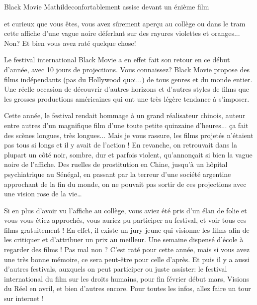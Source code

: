 \vspace*{-1.8cm}
\begin{article}
{Black Movie}
{Mathilde}{confortablement assise devant un énième film}

 et curieux que vous êtes, vous avez sûrement aperçu au collège ou dans le tram cette affiche d'une vague noire déferlant sur des rayures violettes et oranges... Non? Et bien vous avez raté quelque chose!

Le festival international Black Movie a en effet fait son retour en ce début d'année, avec 10 jours de projections. Vous connaissez? Black Movie propose des films indépendants (pas du Hollywood quoi...) de tous genres et du monde entier. Une réelle occasion de découvrir d'autres horizons et d'autres styles de films que les grosses productions américaines qui ont une très légère tendance à s'imposer.


Cette année, le festival rendait hommage à un grand réalisateur chinois, auteur entre autres d'un magnifique film d'une toute petite quinzaine d'heures... ça fait des scènes longues, très longues... Mais je vous rassure, les films projetés n'étaient pas tous si longs et il y avait de l'action ! En revanche, on retrouvait dans la plupart un côté noir, sombre, dur et parfois violent, qu'annonçait si bien la vague noire de l'affiche. Des ruelles de prostitution en Chine, jusqu'à un hôpital psychiatrique au Sénégal, en passant par la terreur d'une société argentine approchant de la fin du monde, on ne pouvait pas sortir de ces projections avec une vision rose de la vie…

Si en plus d'avoir vu l'affiche au collège, vous aviez été pris d'un élan de folie et vous vous étiez approchés, vous auriez pu participer au festival, et voir tous ces films gratuitement ! En effet, il existe un jury jeune qui visionne les films afin de les critiquer et d’attribuer un prix au meilleur. Une semaine dispensé d'école à regarder des films ! Pas mal non ? C'est raté pour cette année, mais si vous avez une très bonne mémoire, ce sera peut-être pour celle d'après. Et puis il y a aussi d'autres festivals, auxquels on peut participer ou juste assister: le festival international du film sur les droits humains, pour fin février début mars, Visions du Réel en avril, et bien d'autres encore. Pour toutes les infos, allez faire un tour sur internet !
\end{article}

